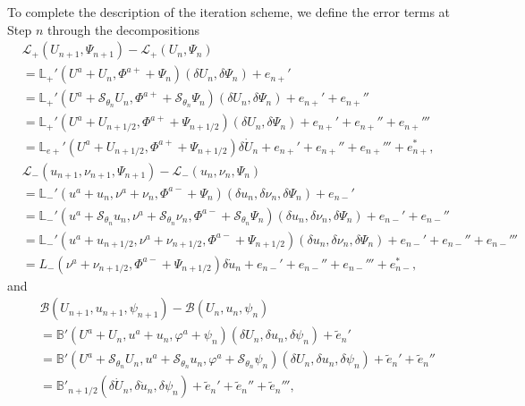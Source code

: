 \documentclass[twoside,11pt]{article}
\numberwithin{equation}{section}
\begin{document}
To complete the description of the iteration scheme,
we define the error terms at Step $n$ through the decompositions
\begin{align}
	\nonumber&\mathcal{L}_+(U_{{n}+1}, \Psi_{{n}+1})-\mathcal{L}_+(U_{{n}}, \Psi_{{n}})\\
	\nonumber	&{}= \mathbb{L}_+'(U^a+U_{{n}}, \Phi^{a+}+ \Psi_{{n}})(\delta U_{{n}},\delta \Psi_{{n}})+e_{{n}+}'\\
	\nonumber&{} = \mathbb{L}_+'(U^a+\mathcal{S}_{\theta_{{n}}}U_{{n}}, \Phi^{a+}+\mathcal{S}_{\theta_{{n}}} \Psi_{{n}})(\delta U_{{n}},\delta \Psi_{{n}})+e_{{n}+}'+e_{{n}+}''\\
	\nonumber&{} = \mathbb{L}_+'(U^a+U_{n+1/2}, \Phi^{a+}+ \Psi_{n+1/2})(\delta U_{{n}},\delta \Psi_{{n}})+e_{{n}+}'+e_{{n}+}''+e_{{n}+}'''\\
	\label{deco1}
	&{} = \mathbb{L}_{e+}'(U^a+U_{n+1/2}, \Phi^{a+}+ \Psi_{n+1/2})\delta \dot{U}_{{n}}+e_{{n}+}'+e_{{n}+}''+e_{{n}+}'''+e_{{n}+}^{*},
	\\[1mm]
	\nonumber&
	\mathcal{L}_-(u_{{n}+1}, \nu_{{n}+1}, \Psi_{{n}+1})-\mathcal{L}_-(u_{{n}},\nu_{{n}},  \Psi_{{n}})\\
	\nonumber	&{}	
	= \mathbb{L}_-'(u^a+u_{{n}}, \nu^a+\nu_{{n}},  \Phi^{a-}+ \Psi_{{n}})(\delta u_{{n}},\delta \nu_{{n}}, \delta \Psi_{{n}})+e_{{n}-}'\\
	\nonumber&{} = \mathbb{L}_-'(u^a+\mathcal{S}_{\theta_{{n}}}u_{{n}},\nu^a+\mathcal{S}_{\theta_{{n}}}\nu_{{n}}, \Phi^{a-}+\mathcal{S}_{\theta_{{n}}} \Psi_{{n}})(\delta u_{{n}},\delta \nu_{{n}},\delta \Psi_{{n}})+e_{{n}-}'+e_{{n}-}''\\
	\nonumber&{} = \mathbb{L}_-'(u^a+u_{n+1/2},\nu^a+\nu_{n+1/2}, \Phi^{a-}+ \Psi_{n+1/2})(\delta u_{{n}},\delta \nu_{{n}},\delta \Psi_{{n}})+e_{{n}-}'+e_{{n}-}''+e_{{n}-}'''\\
	\label{deco2}&{} = {L}_{-}(\nu^a+\nu_{n+1/2}, \Phi^{a-}+ \Psi_{n+1/2})\delta \dot{u}_{{n}}+e_{{n}-}'+e_{{n}-}''+e_{{n}-}'''+e_{{n}-}^{*},
\end{align}
and
\begin{align}
	\nonumber&\mathcal{B}(U_{{n}+1},u_{n+1},\psi_{{n}+1})-\mathcal{B}(U_{{n}},u_n, \psi_{{n}})  \\
	\nonumber&{}
	= \mathbb{B}'(U^a+U_{{n}},u^a+u_n,\varphi^a+\psi_{{n}})(\delta U_{{n}},\delta u_n, \delta\psi_{{n}})+\tilde{e}_{{n} }'\\
	\nonumber&{} = \mathbb{B}'(U^a+\mathcal{S}_{\theta_{{n}}}U_{{n}},u^a+\mathcal{S}_{\theta_{{n}}}u_{{n}},\varphi^a
	+\mathcal{S}_{\theta_{{n}}}\psi_{{n}})(\delta U_{{n}},\delta u_n, \delta\psi_{{n}})+\tilde{e}_{{n} }'+\tilde{e}_{{n} }''\\
	\label{deco3}&{} =\mathbb{B}'_{n+1/2}(\delta \dot{U}_{{n}} ,\delta\dot{u}_n,\delta\psi_{{n}})+\tilde{e}_{{n} }'+\tilde{e}_{{n} }''+\tilde{e}_{{n} }''',
\end{align}
\end{document}
